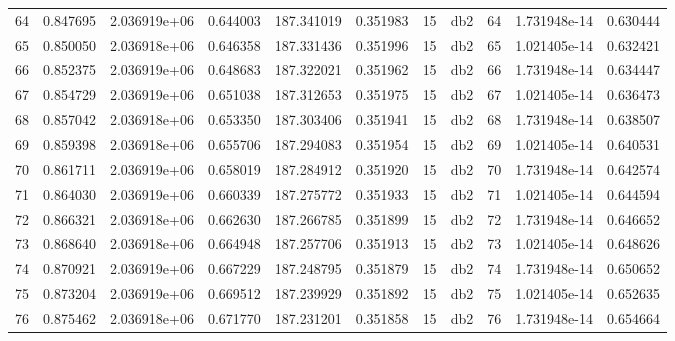 \begin{tabular}{lrrrrrrlrrr}
64   &    0.847695 &        2.036919e+06 &  0.644003 &              187.341019 &    0.351983 &      15 &          db2 &     64 &   1.731948e-14 &      0.630444 \\
65   &    0.850050 &        2.036918e+06 &  0.646358 &              187.331436 &    0.351996 &      15 &          db2 &     65 &   1.021405e-14 &      0.632421 \\
66   &    0.852375 &        2.036919e+06 &  0.648683 &              187.322021 &    0.351962 &      15 &          db2 &     66 &   1.731948e-14 &      0.634447 \\
67   &    0.854729 &        2.036919e+06 &  0.651038 &              187.312653 &    0.351975 &      15 &          db2 &     67 &   1.021405e-14 &      0.636473 \\
68   &    0.857042 &        2.036918e+06 &  0.653350 &              187.303406 &    0.351941 &      15 &          db2 &     68 &   1.731948e-14 &      0.638507 \\
69   &    0.859398 &        2.036918e+06 &  0.655706 &              187.294083 &    0.351954 &      15 &          db2 &     69 &   1.021405e-14 &      0.640531 \\
70   &    0.861711 &        2.036919e+06 &  0.658019 &              187.284912 &    0.351920 &      15 &          db2 &     70 &   1.731948e-14 &      0.642574 \\
71   &    0.864030 &        2.036919e+06 &  0.660339 &              187.275772 &    0.351933 &      15 &          db2 &     71 &   1.021405e-14 &      0.644594 \\
72   &    0.866321 &        2.036918e+06 &  0.662630 &              187.266785 &    0.351899 &      15 &          db2 &     72 &   1.731948e-14 &      0.646652 \\
73   &    0.868640 &        2.036918e+06 &  0.664948 &              187.257706 &    0.351913 &      15 &          db2 &     73 &   1.021405e-14 &      0.648626 \\
74   &    0.870921 &        2.036919e+06 &  0.667229 &              187.248795 &    0.351879 &      15 &          db2 &     74 &   1.731948e-14 &      0.650652 \\
75   &    0.873204 &        2.036919e+06 &  0.669512 &              187.239929 &    0.351892 &      15 &          db2 &     75 &   1.021405e-14 &      0.652635 \\
76   &    0.875462 &        2.036918e+06 &  0.671770 &              187.231201 &    0.351858 &      15 &          db2 &     76 &   1.731948e-14 &      0.654664 \\

\end{tabular}
